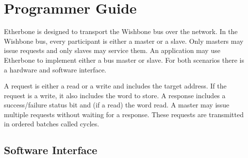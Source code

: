\documentclass{article}
\begin{document}
\section{Programmer Guide}

Etherbone is designed to transport the Wishbone bus over the network.
In the Wishbone bus, every participant is either a master or a slave.
Only masters may issue requests and only slaves may service them.
An application may use Etherbone to implement either a bus master or slave.
For both scenarios there is a hardware and software interface.

A request is either a read or a write and includes the target address.
If the request is a write, it also includes the word to store.
A response includes a success/failure status bit and (if a read) the word read.
A master may issue multiple requests without waiting for a response.
These requests are transmitted in ordered batches called cycles.


\subsection{Software Interface}
\end{document}
